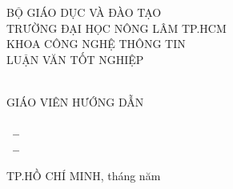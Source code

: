 \begin{titlepage}

  \begin{center}
    BỘ GIÁO DỤC VÀ ĐÀO TẠO\\
    TRƯỜNG ĐẠI HỌC NÔNG LÂM TP.HCM\\
    KHOA CÔNG NGHỆ THÔNG TIN\\[2cm]
    
    \Large LUẬN VĂN TỐT NGHIỆP\\[2cm]

    { \Large \bfseries \MakeUppercase{\tenKL} \\[2cm] } %
    
    \Large GIÁO VIÊN HƯỚNG DẪN\\
    \MakeUppercase{\tenGVHD} \\[1cm]

    { \Large \bfseries \MakeUppercase{\tenSVa~--~\mssva~\\\tenSVb~--~\mssvb} \\[1cm] }

    
    \vfill
    TP.HỒ CHÍ MINH, tháng \hspace*{1cm} năm     
  \end{center}
  
\end{titlepage}